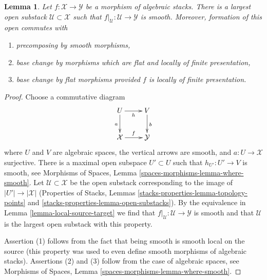 \documentclass[10pt,a4paper]{amsart}
\theoremstyle{plain}
\newtheorem{lemma}[subsection]{Lemma}
\theoremstyle{definition}
\theoremstyle{remark}
\numberwithin{equation}{subsection}
\begin{document}
\begin{lemma}
\label{lemma-where-smooth}
Let $f : \mathcal{X} \to \mathcal{Y}$ be a morphism of algebraic stacks.
There is a largest open substack $\mathcal{U} \subset \mathcal{X}$
such that $f|_\mathcal{U} : \mathcal{U} \to \mathcal{Y}$ is smooth.
Moreover, formation of this open commutes with
\begin{enumerate}
\item precomposing by smooth morphisms,
\item base change by morphisms which are flat and locally of
finite presentation,
\item base change by flat morphisms provided $f$ is locally of
finite presentation.
\end{enumerate}
\end{lemma}

\begin{proof}
Choose a commutative diagram
$$
\xymatrix{
U \ar[d]_a \ar[r]_h & V \ar[d]^b \\
\mathcal{X} \ar[r]^f & \mathcal{Y}
}
$$
where $U$ and $V$ are algebraic spaces, the vertical arrows are smooth,
and $a : U \to \mathcal{X}$ surjective. There is a maximal open subspace
$U' \subset U$ such that $h_{U'} : U' \to V$ is smooth, see
Morphisms of Spaces, Lemma \ref{spaces-morphisms-lemma-where-smooth}.
Let $\mathcal{U} \subset \mathcal{X}$ be the open substack
corresponding to the image of $|U'| \to |\mathcal{X}|$
(Properties of Stacks, Lemmas \ref{stacks-properties-lemma-topology-points} and
\ref{stacks-properties-lemma-open-substacks}).
By the equivalence in Lemma \ref{lemma-local-source-target}
we find that $f|_\mathcal{U} : \mathcal{U} \to \mathcal{Y}$ is smooth
and that $\mathcal{U}$ is the largest open substack with this
property.

\medskip\noindent
Assertion (1) follows from the fact that being smooth
is smooth local on the source (this property was used to even define
smooth morphisms of algebraic stacks).
Assertions (2) and (3) follow from the case of algebraic spaces, see
Morphisms of Spaces, Lemma \ref{spaces-morphisms-lemma-where-smooth}.
\end{proof}
\end{document}
